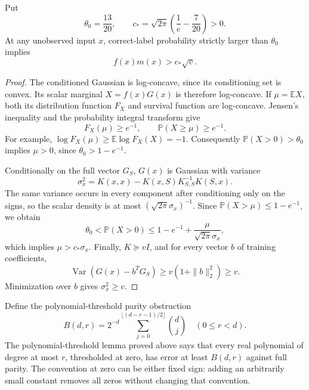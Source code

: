 \begin{lemma}
\label{lem:confidence-latent-margin}
Put
\[
 \theta_0=\frac{13}{20},\qquad
 c_* = \sqrt{2\pi}\left(\frac1e-\frac7{20}\right)>0.
\]
At any unobserved input $x$, correct-label probability strictly
larger than $\theta_0$ implies
\[
 f(x)m(x)>c_*\sqrt v.
\]
\end{lemma}
\begin{proof}
The conditioned Gaussian is log-concave, since its conditioning
set is convex.  Its scalar marginal $X=f(x)G(x)$ is therefore
log-concave.  If $\mu=\mathbb E X$, both its distribution function
$F_X$ and survival function are log-concave.  Jensen's inequality
and the probability integral transform give
\[
 F_X(\mu)\ge e^{-1},\qquad
 \mathbb P(X\ge\mu)\ge e^{-1}.
\]
For example,
$\log F_X(\mu)\ge\mathbb E\log F_X(X)=-1$.
Consequently $\mathbb P(X>0)>\theta_0$ implies $\mu>0$,
since $\theta_0>1-e^{-1}$.

Conditionally on the full vector $G_S$, $G(x)$ is Gaussian with
variance
\[
 \sigma_x^2=K(x,x)-K(x,S)K_{S,S}^{-1}K(S,x).
\]
The same variance occurs in every component after conditioning only
on the signs, so the scalar density is at most
$(\sqrt{2\pi}\sigma_x)^{-1}$.  Since
$\mathbb P(X>\mu)\le1-e^{-1}$, we obtain
\[
 \theta_0<\mathbb P(X>0)
 \le1-e^{-1}+\frac{\mu}{\sqrt{2\pi}\sigma_x},
\]
which implies $\mu>c_*\sigma_x$.
Finally, $K\succeq vI$, and for every vector $b$ of training
coefficients,
\[
 \operatorname{Var}(G(x)-b^TG_S)
 \ge v(1+\|b\|_2^2)\ge v.
\]
Minimization over $b$ gives $\sigma_x^2\ge v$.
\end{proof}

Define the polynomial-threshold parity obstruction
\[
 B(d,r)=2^{-d}\sum_{j=0}^{\lfloor(d-r-1)/2\rfloor}\binom dj
 \quad(0\le r<d).
\]
The polynomial-threshold lemma proved above says that every real
polynomial of degree at most $r$, thresholded at zero, has error
at least $B(d,r)$ against full parity.  The convention at zero can
be either fixed sign: adding an arbitrarily small constant removes
all zeros without changing that convention.

